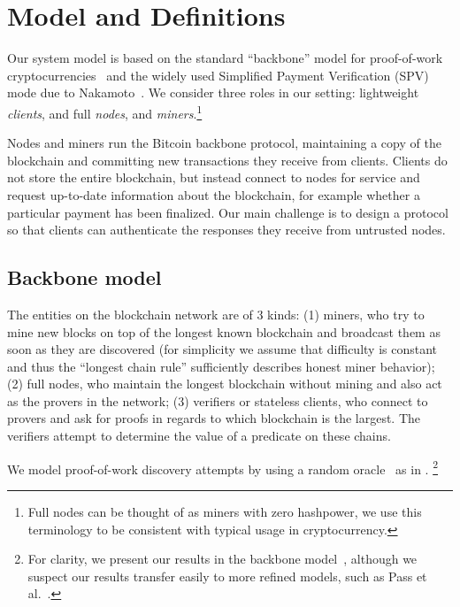 \section{Model and Definitions}
\label{sec.model}
Our system model is based on the standard ``backbone'' model for proof-of-work cryptocurrencies~\cite{backbone} and the widely used Simplified Payment Verification (SPV) mode due to Nakamoto~\cite{bitcoin}.
We consider three roles in our setting: lightweight \emph{clients}, and full \emph{nodes}, and \emph{miners}.\footnote{Full nodes can be thought of as miners with zero hashpower, we use this terminology to be consistent with typical usage in cryptocurrency.}

Nodes and miners run the Bitcoin backbone protocol, maintaining a copy of the blockchain and committing new transactions they receive from clients.
Clients do not store the entire blockchain, but instead connect to nodes for service and request up-to-date information about the blockchain, for example whether a particular payment has been finalized. Our main challenge is to design a protocol so that clients can authenticate the responses they receive from untrusted nodes.

\subsection{Backbone model}


The entities on the blockchain network are of 3 kinds: (1) miners, who
try to mine new blocks on top of the longest known blockchain and broadcast them
as soon as they are discovered (for simplicity we assume that difficulty
is constant and thus the ``longest chain rule'' sufficiently describes honest miner behavior); (2) full nodes, who maintain the longest
blockchain without mining and also act as the provers in the network; (3)
verifiers or stateless clients, who connect to provers and ask for proofs in
regards to which blockchain is the largest. The verifiers attempt to determine
the value of a predicate on these chains.

We model proof-of-work discovery attempts by using a random oracle~\cite{RO} as
in \cite{backbone}.%
\footnote{For clarity, we present our results in the backbone model~\cite{backbone}, although we suspect our results transfer easily to more refined models, such as Pass et al.~\cite{PSS}.}%

